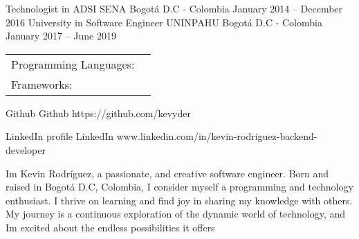 \documentclass[]{awesome-cv}
\begin{document}
\begin{cventries}
	\cventry
	{Technologist in ADSI}
	{SENA}
	{Bogotá D.C - Colombia}
	{January 2014 – December 2016}
	{}
	\cventry
	{University in Software Engineer}
	{UNINPAHU}
	{Bogotá D.C - Colombia}
	{January 2017 – June 2019}
	{}
\end{cventries}

\vspace{-2mm}
\begin{cventries}
	\cventry
	{}
	{\def\arraystretch{1.15}{\begin{tabular}{ l l }
		Programming Languages:  & {\skill{ Python, Javscript, Ruby}} \\
		Frameworks:  & {\skill{ Django, FastAPI, Django REST framework, Flask, Vue JS, Ruby on Rails}} \\
		\end{tabular}}}
	{}
	{}
	{}
\end{cventries}

\vspace{-7mm}
\begin{cventries}
	\cventry
	{Github}
	{Github}
	{}
	{https://github.com/kevyder}
	{}

	\vspace{-5mm}
	\cventry
	{LinkedIn profile}
	{LinkedIn}
	{}
	{www.linkedin.com/in/kevin-rodriguez-backend-developer}
	{}

	\vspace{-5mm}
\end{cventries}
\begin{cvhonors}
	\cvhonor
	{I\textquotesingle{}m Kevin Rodríguez, a passionate, and creative software engineer. Born and raised in Bogotá D.C, Colombia, I consider myself a programming and technology enthusiast. I thrive on learning and find joy in sharing my knowledge with others. My journey is a continuous exploration of the dynamic world of technology, and I\textquotesingle{}m excited about the endless possibilities it offers}
	{}
	{}
	{}
\end{cvhonors}
\
\end{document}
